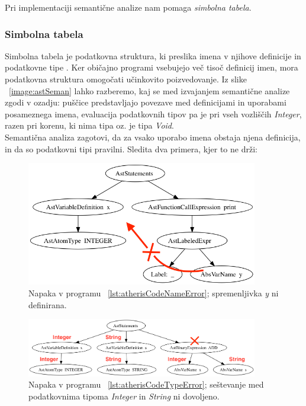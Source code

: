 \documentclass[a4paper, 12p]{book}
\begin{document}
Pri implementaciji semantične analize nam pomaga \textit{simbolna tabela}.

\subsubsection{Simbolna tabela}

Simbolna tabela je podatkovna struktura, ki preslika imena v njihove definicije in podatkovne tipe \cite{modernCompiler}.  Ker običajno programi vsebujejo več tisoč definicij imen, mora podatkovna struktura omogočati učinkovito poizvedovanje. Iz slike ~\ref{image:astSeman} lahko razberemo, kaj se med izvajanjem semantične analize zgodi v ozadju: puščice predstavljajo povezave med definicijami in uporabami posameznega imena, evaluacija podatkovnih tipov pa je pri vseh vozliščih \textit{Integer}, razen pri korenu, ki nima tipa oz. je tipa \textit{Void}.\\
\indent Semantična analiza zagotovi, da za vsako uporabo imena obstaja njena definicija, in da so podatkovni tipi pravilni. Sledita dva primera, kjer to ne drži:

\begin{figure}[h]
	\begin{center}
		\includegraphics[width=0.9\textwidth]{resources/astSemanNameError.png}
	\end{center}
	\caption{Napaka v programu ~\ref{lst:atherisCodeNameError}; spremenljivka \textit{y} ni definirana.}
	\label{image:astSemanCodeNameError}
\end{figure}

\begin{figure}[h]
	\begin{center}
		\includegraphics[width=0.9\textwidth]{resources/astSemanTypeError.png}
	\end{center}
	\caption{Napaka v programu ~\ref{lst:atherisCodeTypeError}; seštevanje med podatkovnima tipoma \textit{Integer} in \textit{String} ni dovoljeno.}
	\label{image:astSemanTypeError}
\end{figure}
\end{document}
